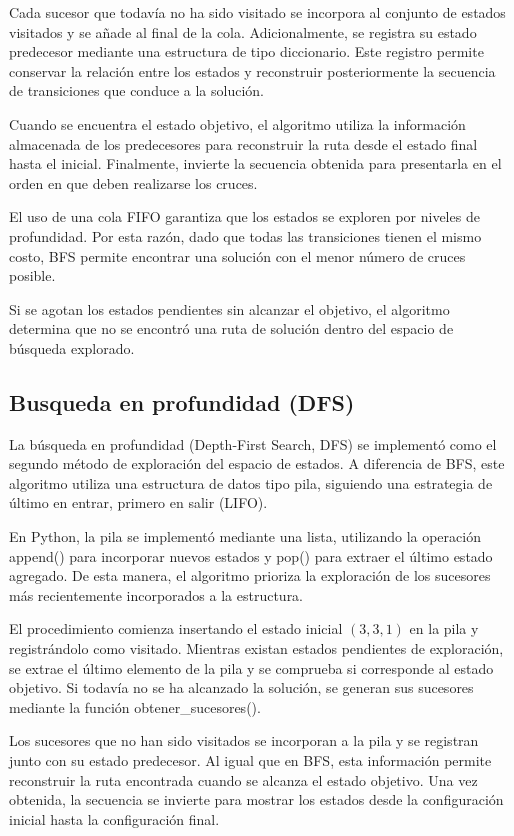 \documentclass[
  spanish,
]{llncs}
\begin{document}
Cada sucesor que todavía no ha sido visitado se incorpora al conjunto de
estados visitados y se añade al final de la cola. Adicionalmente, se
registra su estado predecesor mediante una estructura de tipo
diccionario. Este registro permite conservar la relación entre los
estados y reconstruir posteriormente la secuencia de transiciones que
conduce a la solución.

Cuando se encuentra el estado objetivo, el algoritmo utiliza la
información almacenada de los predecesores para reconstruir la ruta
desde el estado final hasta el inicial. Finalmente, invierte la
secuencia obtenida para presentarla en el orden en que deben realizarse
los cruces.

El uso de una cola FIFO garantiza que los estados se exploren por
niveles de profundidad. Por esta razón, dado que todas las transiciones
tienen el mismo costo, BFS permite encontrar una solución con el menor
número de cruces posible.

Si se agotan los estados pendientes sin alcanzar el objetivo, el
algoritmo determina que no se encontró una ruta de solución dentro del
espacio de búsqueda explorado.

\subsection{Busqueda en profundidad
(DFS)}\label{busqueda-en-profundidad-dfs}

La búsqueda en profundidad (Depth-First Search, DFS) se implementó como
el segundo método de exploración del espacio de estados. A diferencia de
BFS, este algoritmo utiliza una estructura de datos tipo pila, siguiendo
una estrategia de último en entrar, primero en salir (LIFO).

En Python, la pila se implementó mediante una lista, utilizando la
operación append() para incorporar nuevos estados y pop() para extraer
el último estado agregado. De esta manera, el algoritmo prioriza la
exploración de los sucesores más recientemente incorporados a la
estructura.

El procedimiento comienza insertando el estado inicial \((3,3,1)\) en la
pila y registrándolo como visitado. Mientras existan estados pendientes
de exploración, se extrae el último elemento de la pila y se comprueba
si corresponde al estado objetivo. Si todavía no se ha alcanzado la
solución, se generan sus sucesores mediante la función
obtener\_sucesores().

Los sucesores que no han sido visitados se incorporan a la pila y se
registran junto con su estado predecesor. Al igual que en BFS, esta
información permite reconstruir la ruta encontrada cuando se alcanza el
estado objetivo. Una vez obtenida, la secuencia se invierte para mostrar
los estados desde la configuración inicial hasta la configuración final.
\end{document}
